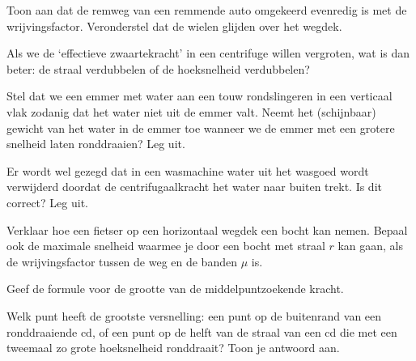 \documentclass{ximera}
\begin{document}
\begin{exercise} Toon aan dat de remweg van een remmende auto omgekeerd
evenredig is met de wrijvingsfactor. Veronderstel dat de wielen
glijden over het wegdek.

\end{exercise}

\begin{exercise} Als we de `effectieve zwaartekracht' in een centrifuge willen vergroten, wat is dan beter: de straal verdubbelen of de hoeksnelheid verdubbelen?

\end{exercise}

\begin{exercise} Stel dat we een emmer met water aan een touw rondslingeren in een verticaal vlak zodanig dat het water niet uit de emmer valt. Neemt het (schijnbaar) gewicht van het water in de emmer toe wanneer we de emmer met een grotere snelheid laten ronddraaien? Leg uit.

\end{exercise}

\begin{exercise} Er wordt wel gezegd dat in een wasmachine water uit het wasgoed wordt verwijderd doordat de centrifugaalkracht het water naar buiten trekt. Is dit correct? Leg uit.

\end{exercise}

\begin{exercise} Verklaar hoe een fietser op een horizontaal wegdek een bocht kan nemen. Bepaal ook de maximale snelheid waarmee je door een bocht met straal $r$ kan gaan, als de wrijvingsfactor tussen de weg en de banden $\mu$ is.

\end{exercise}

\begin{exercise} Geef de formule voor de grootte van de middelpuntzoekende kracht.

\end{exercise}

\begin{exercise} Welk punt heeft de grootste versnelling: een punt op de buitenrand
van een ronddraaiende cd, of een punt op de helft van de straal van
een cd die met een tweemaal zo grote hoeksnelheid ronddraait? Toon
je antwoord aan.

\end{exercise}
\end{document}
